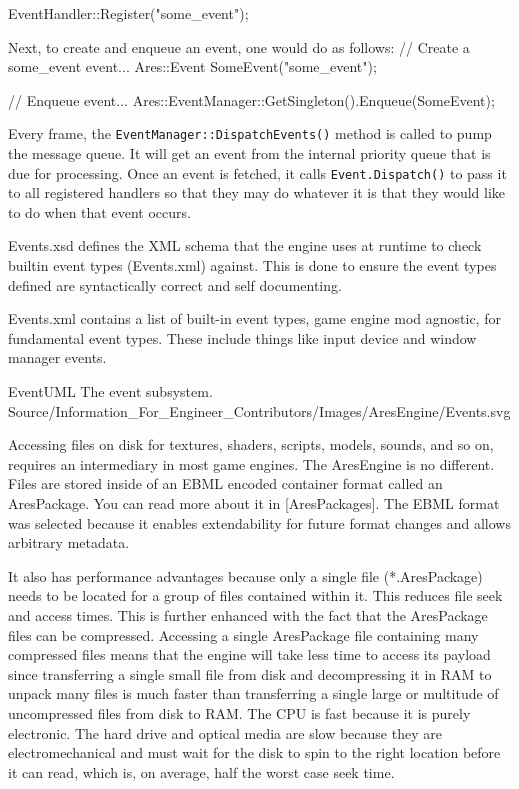 \startCodeExample
EventHandler::Register("some_event");
\stopCodeExample

Next, to create and enqueue an event, one would do as follows:
\startCodeExample
// Create a some_event event...
Ares::Event SomeEvent("some_event");

// Enqueue event...
Ares::EventManager::GetSingleton().Enqueue(SomeEvent);
\stopCodeExample

Every frame, the {\tt EventManager::DispatchEvents()} method is called to pump the message queue. It will get an event from the internal priority queue that is due for processing. Once an event is fetched, it calls {\tt Event.Dispatch()} to pass it to all registered handlers so that they may do whatever it is that they would like to do when that event occurs.

Events.xsd defines the XML schema that the engine uses at runtime to check builtin event types (Events.xml) against. This is done to ensure the event types defined are syntactically correct and self documenting.

Events.xml contains a list of built-in event types, game engine mod agnostic, for fundamental event types. These include things like input device and window manager events.

\FullPageLandscapeDiagram
    {EventUML}
    {The event subsystem.}
    {Source/Information_For_Engineer_Contributors/Images/AresEngine/Events.svg}

\page 
{}
Accessing files on disk for textures, shaders, scripts, models, sounds, and so on, requires an intermediary in most game engines. The AresEngine is no different. Files are stored inside of an EBML encoded container format called an AresPackage. You can read more about it in [AresPackages]. The EBML format was selected because it enables extendability for future format changes and allows arbitrary metadata. 

It also has performance advantages because only a single file (*.AresPackage) needs to be located for a group of files contained within it. This reduces file seek and access times. This is further enhanced with the fact that the AresPackage files can be compressed. Accessing a single AresPackage file containing many compressed files means that the engine will take less time to access its payload since transferring a single small file from disk and decompressing it in RAM to unpack many files is much faster than transferring a single large or multitude of uncompressed files from disk to RAM. The CPU is fast because it is purely electronic. The hard drive and optical media are slow because they are electromechanical and must wait for the disk to spin to the right location before it can read, which is, on average, half the worst case seek time.

